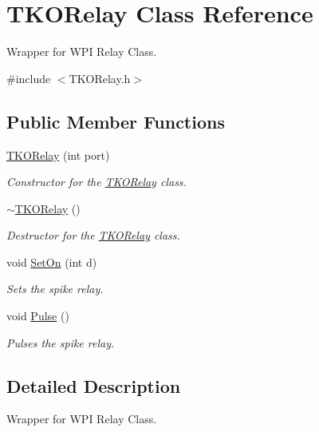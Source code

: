 \hypertarget{class_t_k_o_relay}{\section{T\-K\-O\-Relay Class Reference}
\label{class_t_k_o_relay}
}


Wrapper for W\-P\-I Relay Class.  




{\ttfamily \#include $<$T\-K\-O\-Relay.\-h$>$}

\subsection*{Public Member Functions}
\begin{DoxyCompactItemize}
\item 
\hyperlink{class_t_k_o_relay_a185407021ca76d02fc2d34c1c05fc813}{T\-K\-O\-Relay} (int port)
\begin{DoxyCompactList}\small\item\em Constructor for the \hyperlink{class_t_k_o_relay}{T\-K\-O\-Relay} class. \end{DoxyCompactList}\item 
\hypertarget{class_t_k_o_relay_a426ee22f9bb8db0dad83c9b5944818f9}{\hyperlink{class_t_k_o_relay_a426ee22f9bb8db0dad83c9b5944818f9}{$\sim$\-T\-K\-O\-Relay} ()}\label{class_t_k_o_relay_a426ee22f9bb8db0dad83c9b5944818f9}

\begin{DoxyCompactList}\small\item\em Destructor for the \hyperlink{class_t_k_o_relay}{T\-K\-O\-Relay} class. \end{DoxyCompactList}\item 
void \hyperlink{class_t_k_o_relay_a03b62b4248237ccf41ea9abe5e2df746}{Set\-On} (int d)
\begin{DoxyCompactList}\small\item\em Sets the spike relay. \end{DoxyCompactList}\item 
void \hyperlink{class_t_k_o_relay_a7f4c94b16dc33d4165410d83ef01e191}{Pulse} ()
\begin{DoxyCompactList}\small\item\em Pulses the spike relay. \end{DoxyCompactList}\end{DoxyCompactItemize}


\subsection{Detailed Description}
Wrapper for W\-P\-I Relay Class. 

